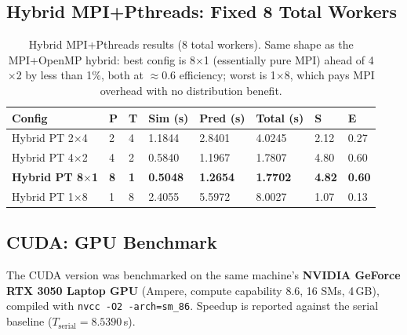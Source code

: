 \documentclass[11pt,a4paper]{article}
\newcommand{\code}[1]{\texttt{\small #1}}
\begin{document}
\subsection{Hybrid MPI+Pthreads: Fixed 8 Total Workers}

\begin{table}[!htbp]
\centering
\begin{tabular}{L{2.6cm} C{0.7cm} C{0.7cm} R{1.4cm} R{1.5cm} R{1.5cm} R{1.0cm} R{1.0cm}}
\toprule
\textbf{Config} & \textbf{P} & \textbf{T} &
\textbf{Sim (s)} & \textbf{Pred (s)} & \textbf{Total (s)} &
\textbf{S} & \textbf{E} \\
\midrule
Hybrid PT 2$\times$4 & 2 & 4 & 1.1844 & 2.8401 & 4.0245 & 2.12 & 0.27 \\
Hybrid PT 4$\times$2 & 4 & 2 & 0.5840 & 1.1967 & 1.7807 & 4.80 & 0.60 \\
\textbf{Hybrid PT 8$\times$1} & \textbf{8} & \textbf{1} & \textbf{0.5048} & \textbf{1.2654} & \textbf{1.7702} & \textbf{4.82} & \textbf{0.60} \\
Hybrid PT 1$\times$8 & 1 & 8 & 2.4055 & 5.5972 & 8.0027 & 1.07 & 0.13 \\
\bottomrule
\end{tabular}
\caption{Hybrid MPI+Pthreads results (8 total workers). Same shape as the
MPI+OpenMP hybrid: best config is 8$\times$1 (essentially pure MPI) ahead of
4$\times$2 by less than 1\%, both at $\approx 0.6$ efficiency; worst is
1$\times$8, which pays MPI overhead with no distribution benefit.}
\label{tab:hybridptresults}
\end{table}

\subsection{CUDA: GPU Benchmark}
\label{sec:cuda-results}

The CUDA version was benchmarked on the same machine's
\textbf{NVIDIA GeForce RTX 3050 Laptop GPU} (Ampere, compute capability 8.6,
16 SMs, 4\,GB), compiled with \code{nvcc -O2 -arch=sm\_86}. Speedup is reported
against the serial baseline ($T_{\text{serial}} = 8.5390$\,s).
\end{document}
